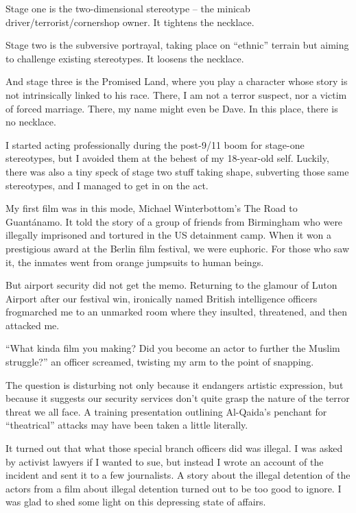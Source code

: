 \documentclass[10pt,a4paper]{article}
\begin{document}
Stage one is the two-dimensional stereotype – the minicab driver/terrorist/cornershop owner. It tightens the necklace.

Stage two is the subversive portrayal, taking place on “ethnic” terrain but aiming to challenge existing stereotypes. It loosens the necklace.

And stage three is the Promised Land, where you play a character whose story is not intrinsically linked to his race. There, I am not a terror suspect, nor a victim of forced marriage. There, my name might even be Dave. In this place, there is no necklace.

I started acting professionally during the post-9/11 boom for stage-one stereotypes, but I avoided them at the behest of my 18-year-old self. Luckily, there was also a tiny speck of stage two stuff taking shape, subverting those same stereotypes, and I managed to get in on the act.

My first film was in this mode, Michael Winterbottom’s The Road to Guantánamo. It told the story of a group of friends from Birmingham who were illegally imprisoned and tortured in the US detainment camp. When it won a prestigious award at the Berlin film festival, we were euphoric. For those who saw it, the inmates went from orange jumpsuits to human beings.

But airport security did not get the memo. Returning to the glamour of Luton Airport after our festival win, ironically named British intelligence officers frogmarched me to an unmarked room where they insulted, threatened, and then attacked me.

“What kinda film you making? Did you become an actor to further the Muslim struggle?” an officer screamed, twisting my arm to the point of snapping.

The question is disturbing not only because it endangers artistic expression, but because it suggests our security services don’t quite grasp the nature of the terror threat we all face. A training presentation outlining Al-Qaida’s penchant for “theatrical” attacks may have been taken a little literally.

It turned out that what those special branch officers did was illegal. I was asked by activist lawyers if I wanted to sue, but instead I wrote an account of the incident and sent it to a few journalists. A story about the illegal detention of the actors from a film about illegal detention turned out to be too good to ignore. I was glad to shed some light on this depressing state of affairs.
\end{document}
